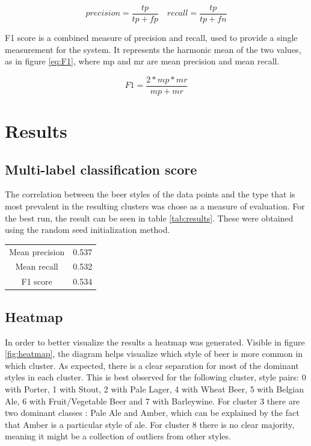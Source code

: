 \documentclass[12pt]{article}
\begin{document}
	\begin{equation}
	\label{eq:PrecRecall}
	precision = \frac{tp}{tp + fp} \quad recall = \frac{tp}{tp + fn}
	\end{equation}
	
	F1 score is a combined measure of precision and recall, used to provide a single measurement for the system. It represents the harmonic mean of the two values, as in figure \ref{eq:F1}, where mp and mr are mean precision and mean recall.
	
	\begin{equation}
	\label{eq:F1}
	F1 = \frac{2 * mp * mr}{mp + mr}
	\end{equation}
	
	\section{Results}
	\subsection{Multi-label classification score}
	The correlation between the beer styles of the data points and the type that is most prevalent in the resulting clusters was chose as a measure of evaluation. For the best run, the result can be seen in table \ref{tab:results}. These were obtained using the random seed initialization method.
	
	\begin{center}
		\label{tab:results}
		\begin{tabular}{ |c|c| } 
			\hline
			Mean precision & 0.537 \\
			Mean recall & 0.532 \\
			F1 score & 0.534 \\
			\hline
		\end{tabular}
	\end{center}

	\subsection{Heatmap}
	In order to better visualize the results a heatmap was generated. Visible in figure \ref{fig:heatmap}, the diagram helps visualize which style of beer is more common in which cluster. As expected, there is a clear separation for most of the dominant styles in each cluster. This is best observed for the following cluster, style pairs: 0 with Porter, 1 with Stout, 2 with Pale Lager, 4 with Wheat Beer, 5 with Belgian Ale, 6 with Fruit/Vegetable Beer and 7 with Barleywine. For cluster 3 there are two dominant classes : Pale Ale and Amber, which can be explained by the fact that Amber is a particular style of ale. For cluster 8 there is no clear majority, meaning it might be a collection of outliers from other styles.
	
\end{document}

